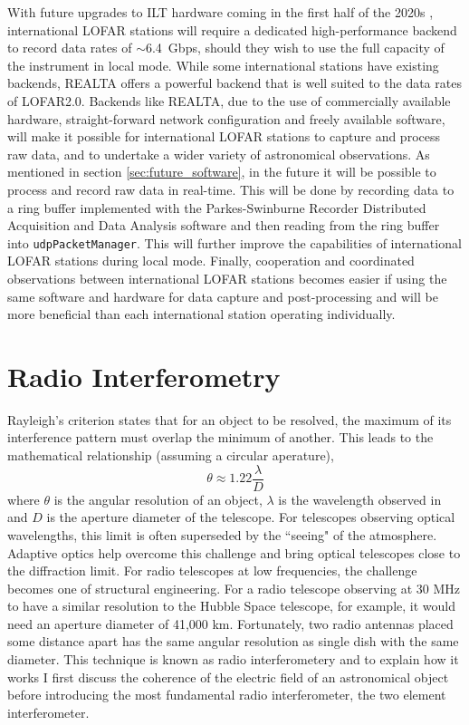 With future upgrades to ILT hardware coming in the first half of the 2020s \citep[mainly, LOFAR2.0;][]{Edler2021}, international LOFAR stations will require a dedicated high-performance backend to record data rates of $\sim$6.4~Gbps, should they wish to use the full capacity of the instrument in local mode. While some international stations have existing backends, REALTA offers a powerful backend that is well suited to the data rates of LOFAR2.0. Backends like REALTA, due to the use of commercially available hardware, straight-forward network configuration and freely available software, will make it possible for international LOFAR stations to capture and process raw data, and to undertake a wider variety of astronomical observations. As mentioned in section \ref{sec:future_software}, in the future it will be possible to process and record raw data in real-time. This will be done by recording data to a ring buffer implemented with the Parkes-Swinburne Recorder Distributed Acquisition and Data Analysis software \citep[PSRDADA;][]{PSRDADA} and then reading from the ring buffer into \texttt{udpPacketManager}. This will further improve the capabilities of international LOFAR stations during local mode. Finally, cooperation and coordinated observations between international LOFAR stations becomes easier if using the same software and hardware for data capture and post-processing and will be more beneficial than each international station operating individually.

\section{Radio Interferometry}
\label{sec:interferometry}
Rayleigh's criterion states that for an object to be resolved, the maximum of its interference pattern must overlap the minimum of another. This leads to the mathematical relationship (assuming a circular aperature), 
$$\theta \approx 1.22 \frac{\lambda}{D}$$ 
where $\theta$ is the angular resolution of an object, $\lambda$ is the wavelength observed in and $D$ is the aperture diameter of the telescope. For telescopes observing optical wavelengths, this limit is often superseded by the ``seeing" of the atmosphere. Adaptive optics help overcome this challenge and bring optical telescopes close to the diffraction limit. For radio telescopes at low frequencies, the challenge becomes one of structural engineering. For a radio telescope observing at 30 MHz to have a similar resolution to the Hubble Space telescope, for example, it would need an aperture diameter of 41,000 km. Fortunately, two radio antennas placed some distance apart has the same angular resolution as single dish with the same diameter. This technique is known as radio interferometery and to explain how it works I first discuss the coherence of the electric field of an astronomical object before introducing the most fundamental radio interferometer, the two element interferometer.


